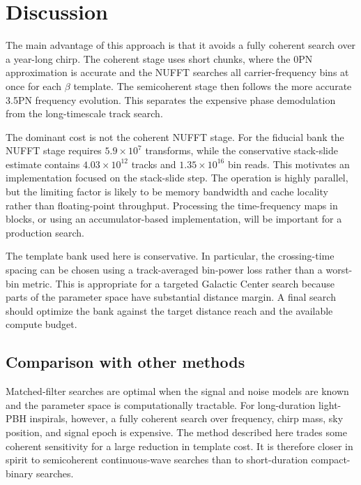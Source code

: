 \documentclass[aps,prd,amsmath,floats,floatfix, twocolumn,
superscriptaddress,nofootinbib,showpacs]{revtex4-2}
\begin{document}

\section{Discussion}
\label{sec:discussion}
The main advantage of this approach is that it avoids a fully coherent search
over a year-long chirp.  The coherent stage uses short chunks, where the 0PN
approximation is accurate and the NUFFT searches all carrier-frequency bins at
once for each $\beta$ template.  The semicoherent stage then follows the more
accurate 3.5PN frequency evolution.  This separates the expensive phase
demodulation from the long-timescale track search.

The dominant cost is not the coherent NUFFT stage.  For the fiducial bank the
NUFFT stage requires $5.9\times10^7$ transforms, while the conservative
stack-slide estimate contains $4.03\times10^{12}$ tracks and
$1.35\times10^{16}$ bin reads.  This motivates an implementation focused on
the stack-slide step.  The operation is highly parallel, but the limiting
factor is likely to be memory bandwidth and cache locality rather than
floating-point throughput.  Processing the time-frequency maps in blocks, or
using an accumulator-based implementation, will be important for a production
search.

The template bank used here is conservative.  In particular, the crossing-time
spacing can be chosen using a track-averaged bin-power loss rather than a
worst-bin metric.  This is appropriate for a targeted Galactic Center search
because parts of the parameter space have substantial distance margin.  A final
search should optimize the bank against the target distance reach and the
available compute budget.


\subsection{Comparison with other methods}
Matched-filter searches are optimal when the signal and noise models are known
and the parameter space is computationally tractable.  For long-duration
light-PBH inspirals, however, a fully coherent search over frequency, chirp
mass, sky position, and signal epoch is expensive.  The method described here
trades some coherent sensitivity for a large reduction in template cost.  It is
therefore closer in spirit to semicoherent continuous-wave searches than to
short-duration compact-binary searches.
\end{document}
